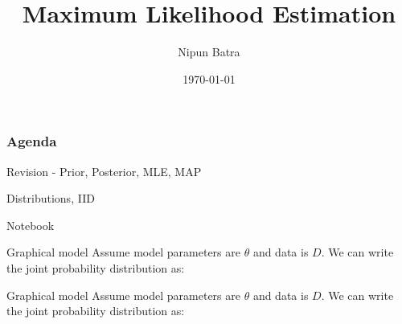 \documentclass[handout]{beamer}
\begin{document}
\title{Maximum Likelihood Estimation}
\author{Nipun Batra}
\date{\today}
\maketitle
{}
\begin{frame}
    \frametitle{Agenda}
    \tableofcontents[hidesubsections]
    \end{frame}
    
\begin{section}{Revision - Prior, Posterior, MLE, MAP}
\end{section}
\begin{section}{Distributions, IID}
    \begin{frame}
        Notebook
    \end{frame}

    \begin{frame}{Graphical model}
        Assume model parameters are $\theta$ and data is $D  $. We can write the joint probability distribution as:

        
    \end{frame}

    \begin{frame}{Graphical model}
        Assume model parameters are $\theta$ and data is $D  $. We can write the joint probability distribution as:


\end{frame}
\end{section}
\end{document}

